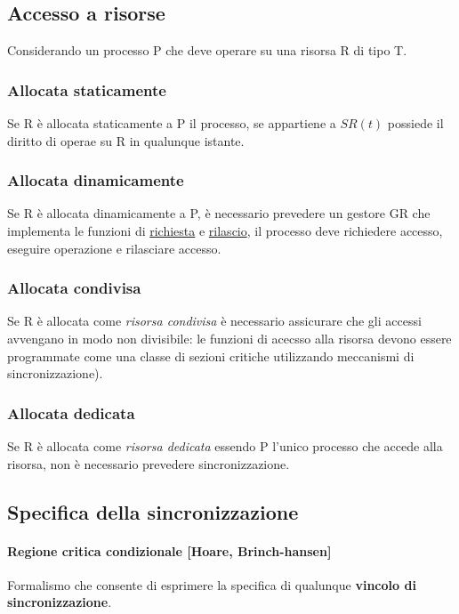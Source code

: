 \subsection{Accesso a risorse}
Considerando un processo P che deve operare su una risorsa R di tipo T.

\subsubsection{Allocata staticamente}
Se R è allocata staticamente a P il processo, se appartiene a $SR(t)$ possiede il diritto di operae su R in qualunque istante.

\subsubsection{Allocata dinamicamente}
Se R è allocata dinamicamente a P, è necessario prevedere un gestore GR che implementa le funzioni di \underline{richiesta} e \underline{rilascio}, il processo deve richiedere accesso, eseguire operazione e rilasciare accesso.

\subsubsection{Allocata condivisa}
Se R è allocata come \textit{risorsa condivisa} è necessario assicurare che gli accessi avvengano in modo non divisibile: le funzioni di acecsso alla risorsa devono essere programmate come una classe di sezioni critiche utilizzando meccanismi di sincronizzazione).

\subsubsection{Allocata dedicata}
Se R è allocata come \textit{risorsa dedicata} essendo P l'unico processo che accede alla risorsa, non è necessario prevedere sincronizzazione.

\subsection{Specifica della sincronizzazione}

\paragraph{Regione critica condizionale [Hoare, Brinch-hansen]} Formalismo che consente di esprimere la specifica di qualunque \textbf{vincolo di sincronizzazione}.

